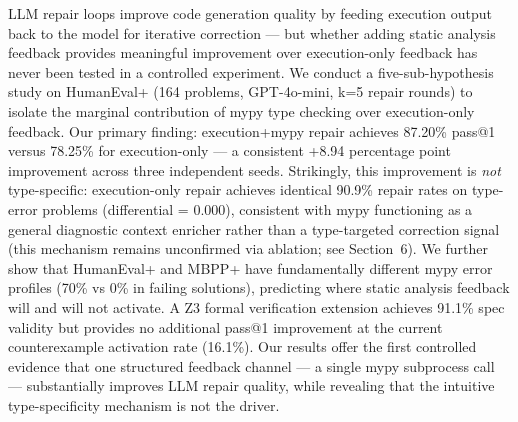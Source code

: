 LLM repair loops improve code generation quality by feeding execution output
back to the model for iterative correction --- but whether adding static analysis
feedback provides meaningful improvement over execution-only feedback has never
been tested in a controlled experiment. We conduct a five-sub-hypothesis study
on HumanEval+ (164 problems, GPT-4o-mini, k=5 repair rounds) to isolate the
marginal contribution of mypy type checking over execution-only feedback. Our
primary finding: execution+mypy repair achieves 87.20\% pass@1 versus 78.25\%
for execution-only --- a consistent +8.94 percentage point improvement across
three independent seeds. Strikingly, this improvement is \emph{not} type-specific:
execution-only repair achieves identical 90.9\% repair rates on type-error
problems (differential = 0.000), consistent with mypy functioning as a general
diagnostic context enricher rather than a type-targeted correction signal
(this mechanism remains unconfirmed via ablation; see Section~6).
We further show that HumanEval+ and MBPP+ have fundamentally different mypy
error profiles (70\% vs 0\% in failing solutions), predicting where static
analysis feedback will and will not activate. A Z3 formal verification
extension achieves 91.1\% spec validity but provides no additional pass@1
improvement at the current counterexample activation rate (16.1\%). Our
results offer the first controlled evidence that one structured feedback
channel --- a single mypy subprocess call --- substantially improves LLM repair
quality, while revealing that the intuitive type-specificity mechanism is not
the driver.
